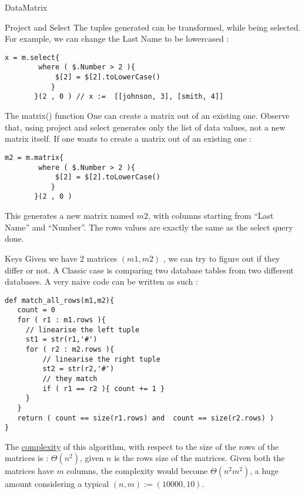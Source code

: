 \begin{section}{DataMatrix}
\begin{subsection}{Project and Select}
The tuples generated can be transformed, while being selected.
For example, we can change the Last Name to be lowercased :

\begin{lstlisting}[style=JexlStyle]
x = m.select{  
        where ( $.Number > 2 ){ 
            $[2] = $[2].toLowerCase() 
           }  
       }(2 , 0 ) // x :=  [[johnson, 3], [smith, 4]]
\end{lstlisting}

\end{subsection}

\begin{subsection}{The matrix() function}
One can create a matrix out of an existing one.
Observe that, using project and select generates only the list of data values, 
not a new matrix itself. If one wants to create a matrix out of an existing one :

\begin{lstlisting}[style=JexlStyle]
m2 = m.matrix{  
        where ( $.Number > 2 ){ 
            $[2] = $[2].toLowerCase() 
           }  
       }(2 , 0 ) 
\end{lstlisting}
This generates a new matrix named $m2$, with columns starting from ``Last Name'' and ``Number''.
The rows values are exactly the same as the select query done.

\end{subsection}


\begin{subsection}{Keys}
Given we have 2 matrices $(m1,m2)$ , we can try to figure out if they differ or not.
A Classic case is comparing two database tables from two different databases.
A very naive code can be written as such :
\begin{lstlisting}[style=JexlStyle]
def match_all_rows(m1,m2){
   count = 0 
   for ( r1 : m1.rows ){
     // linearise the left tuple
     st1 = str(r1,'#')
     for ( r2 : m2.rows ){
         // linearise the right tuple
         st2 = str(r2,'#')
         // they match 
         if ( r1 == r2 ){ count += 1 } 
     }
   }
   return ( count == size(r1.rows) and  count == size(r2.rows) )
}
\end{lstlisting}

The \href{https://en.wikipedia.org/wiki/Computational\_complexity\_theory}{complexity} of this algorithm, 
with respect to the size of the rows of the matrices is : $\Theta(n^2)$, given $n$ is the rows size of the matrices. 
Given both the matrices have $m$ columns, the complexity would become $\Theta(n^2m^2)$, a huge amount considering
a typical $(n,m) := ( 10000, 10 ) $. 


\end{subsection}
\end{section}

